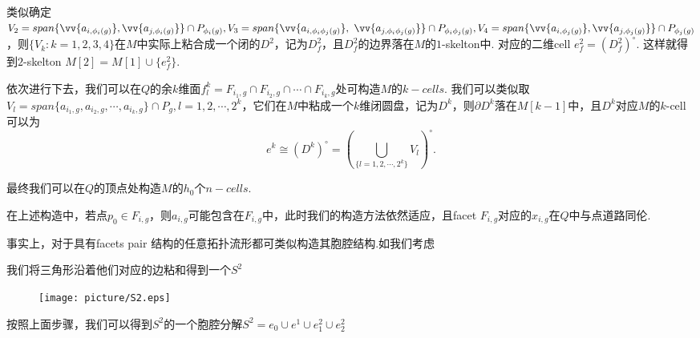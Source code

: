 \documentclass{article}
\theoremstyle{plain}%
\theoremstyle{definition}
\theoremstyle{remark}
\begin{document}
类似确定$V_2=span\{\vv{a_{i,\phi_i(g)}},\vv{a_{j,\phi_i(g)}}\}\cap P_{\phi_i(g)},V_3=span\{\vv{a_{i,\phi_i\phi_j(g)}},\\~\vv{a_{j,\phi_i\phi_j(g)}}\}\cap P_{\phi_i\phi_j(g)},V_4=span\{\vv{a_{i,\phi_j(g)}},\vv{a_{j,\phi_j(g)}}\}\cap P_{\phi_j(g)}$，则$\{V_k:k=1,2,3,4\}$在$M$中实际上粘合成一个闭的$D^2$，记为$D^2_f$，且$D^2_f$的边界落在$M$的$1$-skelton中. 对应的二维cell $e_f^2=(D^2_f)^{\circ}$. 这样就得到$2$-skelton $M[2]=M[1]\cup \{e_f^2\}$.

依次进行下去，我们可以在$Q$的余$k$维面$f_l^k=F_{i_1,g}\cap F_{i_2,g}\cap \cdots \cap F_{i_k,g}$处可构造$M$的$k-cells$. 我们可以类似取$V_l=span\{a_{i_1,g}, a_{i_2,g},\cdots, a_{i_k,g}\}\cap P_g, l=1,2,\cdots,2^k$，它们在$M$中粘成一个$k$维闭圆盘，记为$D^k$，则$\partial D^k$落在$M[k-1]$中，且$D^k$对应$M$的$k$-cell 可以为
\begin{equation*}\label{eq3}
e^k\cong (D^k)^\circ=\left(\bigcup_{\{l=1,2,\cdots,2^k\}} V_l\right)^{\circ}.
\end{equation*}

 最终我们可以在$Q$的顶点处构造$M$的$h_0$个$n-cells$.

{\rem 在上述构造中，若点$p_0\in F_{i,g}$，则$a_{i,g}$可能包含在$F_{i,g}$中，此时我们的构造方法依然适应，且facet $F_{i,g}$对应的$x_{i,g}$在$Q$中与点道路同伦. }

事实上，对于具有facets pair 结构的任意拓扑流形都可类似构造其胞腔结构.如我们考虑
{\exmp 我们将三角形沿着他们对应的边粘和得到一个$S^2$
\begin{figure}[H]
 \centering
 \texttt{[image: picture/S2.eps]}
\end{figure}
按照上面步骤，我们可以得到$S^2$的一个胞腔分解$S^2=e_0\cup e^1 \cup e_1^2\cup e_2^2$}
\end{document}
